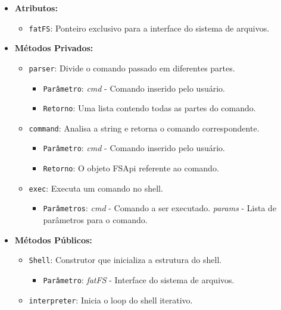 \documentclass[
    12pt,				%
    oneside,   	        %
    a4paper,			%
    english,			%
    french,				%
    spanish,			%
    brazil,				%
    ]{pacotes/abntex2}
\begin{document}
\begin{itemize}
    \item \textbf{Atributos:}
        \begin{itemize}
            \item \texttt{fatFS}: Ponteiro exclusivo para a interface do sistema de arquivos.
        \end{itemize}
    \item \textbf{M\'etodos Privados:}
        \begin{itemize}
            \item \texttt{parser}: Divide o comando passado em diferentes partes.
            \begin{itemize}
                \item \texttt{Parâmetro}: \textit{cmd} - Comando inserido pelo usuário.
                \item \texttt{Retorno}: Uma lista contendo todas as partes do comando.
            \end{itemize}
            
            \item \texttt{command}: Analisa a string e retorna o comando correspondente.
            \begin{itemize}
                \item \texttt{Parâmetro}: \textit{cmd} - Comando inserido pelo usuário.
                \item \texttt{Retorno}: O objeto FSApi referente ao comando.
            \end{itemize}
            
            \item \texttt{exec}: Executa um comando no shell.
            \begin{itemize}
                \item \texttt{Parâmetros}: \textit{cmd} - Comando a ser executado. \textit{params} - Lista de parâmetros para o comando.
            \end{itemize}
        \end{itemize}
    \item \textbf{M\'etodos P\'ublicos:}
        \begin{itemize}
            \item \texttt{Shell}: Construtor que inicializa a estrutura do shell.
            \begin{itemize}
                \item \texttt{Parâmetro}: \textit{fatFS} - Interface do sistema de arquivos.
            \end{itemize}
            
            \item \texttt{interpreter}: Inicia o loop do shell iterativo.
        \end{itemize}
\end{itemize}
\end{document}
